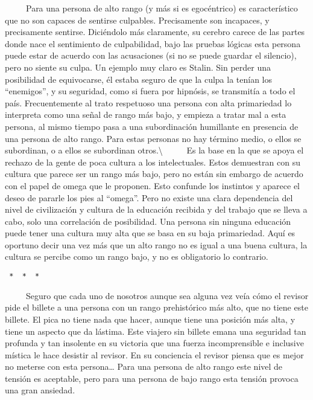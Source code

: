 ~ ~ ~ Para una persona de alto rango (y más si es egocéntrico) es
característico que no son capaces de sentirse culpables. Precisamente
son incapaces, y precisamente sentirse. Diciéndolo más claramente, su
cerebro carece de las partes donde nace el sentimiento de culpabilidad,
bajo las pruebas lógicas esta persona puede estar de acuerdo con las
acusaciones (si no se puede guardar el silencio), pero no siente su
culpa. Un ejemplo muy claro es Stalin. Sin perder una posibilidad de
equivocarse, él estaba seguro de que la culpa la tenían los
``enemigos'', y su seguridad, como si fuera por hipnósis, se transmitía
a todo el país. Frecuentemente al trato respetuoso una persona con alta
primariedad lo interpreta como una señal de rango más bajo, y empieza a
tratar mal a esta persona, al mismo tiempo pasa a una subordinación
humillante en presencia de una persona de alto rango. Para estas
personas no hay término medio, o ellos se subordinan, o a ellos se
subordinan otros.\textbackslash{} ~ ~ ~ Es la base en la que se apoya el
rechazo de la gente de poca cultura a los intelectuales. Estos
demuestran con su cultura que parece ser un rango más bajo, pero no
están sin embargo de acuerdo con el papel de omega que le proponen. Esto
confunde los instintos y aparece el deseo de pararle los pies al
``omega''. Pero no existe una clara dependencia del nivel de
civilización y cultura de la educación recibida y del trabajo que se
lleva a cabo, solo una correlación de posibilidad. Una persona sin
ninguna educación puede tener una cultura muy alta que se basa en su
baja primariedad. Aquí es oportuno decir una vez más que un alto rango
no es igual a una buena cultura, la cultura se percibe como un rango
bajo, y no es obligatorio lo contrario.

\begin{verbatim}
 *  *  * 
\end{verbatim}

~ ~ ~ Seguro que cada uno de nosotros aunque sea alguna vez veía cómo el
revisor pide el billete a una persona con un rango prehistórico más
alto, que no tiene este billete. El pica no tiene nada que hacer, aunque
tiene una posición más alta, y tiene un aspecto que da lástima. Este
viajero sin billete emana una seguridad tan profunda y tan insolente en
su victoria que una fuerza incomprensible e inclusive mística le hace
desistir al revisor. En su conciencia el revisor piensa que es mejor no
meterse con esta persona\ldots{} Para una persona de alto rango este
nivel de tensión es aceptable, pero para una persona de bajo rango esta
tensión provoca una gran ansiedad.

